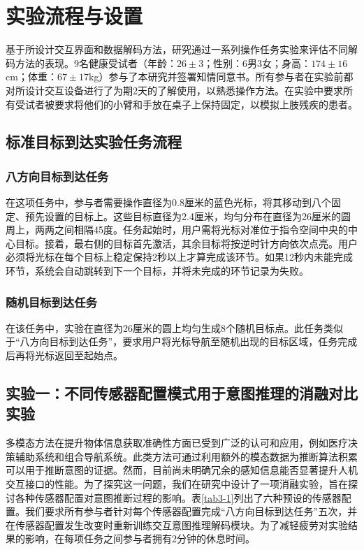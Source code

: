\section{实验流程与设置}基于所设计交互界面和数据解码方法，研究通过一系列操作任务实验来评估不同解码方法的表现。9名健康受试者（年龄：$26\pm3$；性别：6男3女；身高：$174\pm16$cm；体重：$67\pm17$kg）参与了本研究并签署知情同意书。所有参与者在实验前都对所设计交互设备进行了为期2天的了解使用，以熟悉操作方法。在实验中要求所有受试者被要求将他们的小臂和手放在桌子上保持固定，以模拟上肢残疾的患者。

\subsection{标准目标到达实验任务流程}   
    \subsubsection{八方向目标到达任务}在这项任务中，参与者需要操作直径为0.8厘米的蓝色光标，将其移动到八个固定、预先设置的目标上。这些目标直径为2.4厘米，均匀分布在直径为26厘米的圆周上，两两之间相隔45度。任务起始时，用户需将光标对准位于指令空间中央的中心目标。接着，最右侧的目标首先激活，其余目标将按逆时针方向依次点亮。用户必须将光标在每个目标上稳定保持2秒以上才算完成该环节。如果12秒内未能完成环节，系统会自动跳转到下一个目标，并将未完成的环节记录为失败。

   \subsubsection{随机目标到达任务}在该任务中，实验在直径为26厘米的圆上均匀生成8个随机目标点。此任务类似于“八方向目标到达任务”，要求用户将光标导航至随机出现的目标区域，任务完成后再将光标返回至起始点。

\subsection{实验一：不同传感器配置模式用于意图推理的消融对比实验} 多模态方法在提升物体信息获取准确性方面已受到广泛的认可和应用，例如医疗决策辅助系统和组合导航系统\cite{williamsonContinuousUncertainInteraction2006}。此类方法可通过利用额外的模态数据为推断算法积累可以用于推断意图的证据。然而，目前尚未明确冗余的感知信息能否显著提升人机交互接口的性能。为了探究这一问题，我们在研究中设计了一项消融实验，旨在探讨各种传感器配置对意图推断过程的影响。表\ref{tab3-1}列出了六种预设的传感器配置。我们要求所有参与者针对每个传感器配置完成``八方向目标到达任务''五次，并在传感器配置发生改变时重新训练交互意图推理解码模块。为了减轻疲劳对实验结果的影响，在每项任务之间参与者拥有2分钟的休息时间。 

